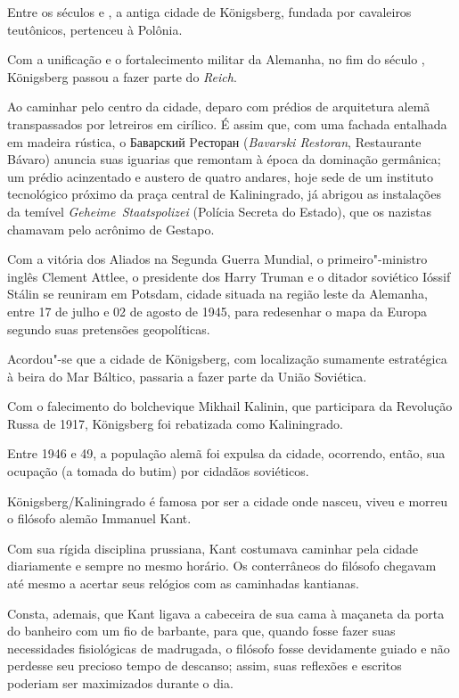 Entre os séculos  e , a antiga cidade de Königsberg, fundada por
cavaleiros teutônicos, pertenceu à Polônia.

Com a unificação e o fortalecimento militar da Alemanha, no fim do
século , Königsberg passou a fazer parte do \emph{Reich}.

Ao caminhar pelo centro da cidade, deparo com prédios de arquitetura
alemã transpassados por letreiros em cirílico. É assim que, com uma
fachada entalhada em madeira rústica, o Баварский Pесторан
(\emph{Bavarski Restoran}, Restaurante Bávaro) anuncia suas iguarias que
remontam à época da dominação germânica; um prédio acinzentado e austero
de quatro andares, hoje sede de um instituto tecnológico próximo da
praça central de Kaliningrado, já abrigou as instalações da temível
\emph{Geheime~Staatspolizei} (Polícia Secreta do Estado), que os
nazistas chamavam pelo acrônimo de Gestapo.

Com a vitória dos Aliados na Segunda Guerra Mundial, o primeiro"-ministro
inglês Clement Attlee, o presidente dos  Harry Truman e o ditador
soviético Ióssif Stálin se reuniram em Potsdam, cidade situada na região
leste da Alemanha, entre 17 de julho e 02 de agosto de 1945, para
redesenhar o mapa da Europa segundo suas pretensões geopolíticas.

Acordou"-se que a cidade de Königsberg, com localização sumamente
estratégica à beira do Mar Báltico, passaria a fazer parte da União
Soviética.

Com o falecimento do bolchevique Mikhail Kalinin, que participara da
Revolução Russa de 1917, Königsberg foi rebatizada como Kaliningrado.

Entre 1946 e 49, a população alemã foi expulsa da cidade, ocorrendo,
então, sua ocupação (a tomada do butim) por cidadãos soviéticos.

Königsberg/Kaliningrado é famosa por ser a cidade onde nasceu, viveu e
morreu o filósofo alemão Immanuel Kant.

Com sua rígida disciplina prussiana, Kant costumava caminhar pela cidade
diariamente e sempre no mesmo horário. Os conterrâneos do filósofo
chegavam até mesmo a acertar seus relógios com as caminhadas kantianas.

Consta, ademais, que Kant ligava a cabeceira de sua cama à maçaneta da
porta do banheiro com um fio de barbante, para que, quando fosse fazer
suas necessidades fisiológicas de madrugada, o filósofo fosse
devidamente guiado e não perdesse seu precioso tempo de descanso; assim,
suas reflexões e escritos poderiam ser maximizados durante o dia.

